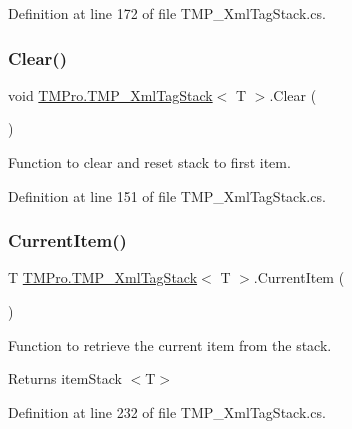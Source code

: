 Definition at line 172 of file T\+M\+P\+\_\+\+Xml\+Tag\+Stack.\+cs.

\mbox{\label{struct_t_m_pro_1_1_t_m_p___xml_tag_stack_a58f2d9eef0b3308d87ffe390e223bced}} 
\subsubsection{\texorpdfstring{Clear()}{Clear()}}
{\footnotesize\ttfamily void \mbox{\hyperlink{struct_t_m_pro_1_1_t_m_p___xml_tag_stack}{T\+M\+Pro.\+T\+M\+P\+\_\+\+Xml\+Tag\+Stack}}$<$ T $>$.Clear (\begin{DoxyParamCaption}{ }\end{DoxyParamCaption})}



Function to clear and reset stack to first item. 



Definition at line 151 of file T\+M\+P\+\_\+\+Xml\+Tag\+Stack.\+cs.

\mbox{\label{struct_t_m_pro_1_1_t_m_p___xml_tag_stack_ad2d0ec4ced3b5e0e1cf97b2fe91f4957}} 
\subsubsection{\texorpdfstring{CurrentItem()}{CurrentItem()}}
{\footnotesize\ttfamily T \mbox{\hyperlink{struct_t_m_pro_1_1_t_m_p___xml_tag_stack}{T\+M\+Pro.\+T\+M\+P\+\_\+\+Xml\+Tag\+Stack}}$<$ T $>$.Current\+Item (\begin{DoxyParamCaption}{ }\end{DoxyParamCaption})}



Function to retrieve the current item from the stack. 

\begin{DoxyReturn}{Returns}
item\+Stack $<$\+T$>$
\end{DoxyReturn}


Definition at line 232 of file T\+M\+P\+\_\+\+Xml\+Tag\+Stack.\+cs.

